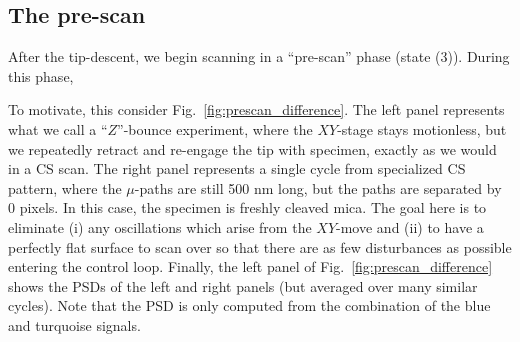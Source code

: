 \documentclass[twocolumn,oneside]{IEEEtran/IEEEtran}
\begin{document}
\subsection{The pre-scan}
%     
%     
%     
After the tip-descent, we begin scanning in a ``pre-scan'' phase (state (3)).
During this phase, 

To motivate, this consider Fig.~\ref{fig:prescan_difference}. The left panel
represents what we call a ``$Z$''-bounce experiment, where the $XY$-stage stays
motionless, but we repeatedly retract and re-engage the tip with specimen,
exactly as we would in a CS scan. The right panel represents a single cycle from
specialized CS pattern, where the $\mu$-paths are still 500 nm long, but the
paths are separated by 0 pixels.
In this case, the specimen is freshly cleaved
mica.
The goal here is to eliminate (i) any oscillations which arise from the
$XY$-move and (ii) to have a perfectly flat surface to scan over so that
there are as few disturbances as possible entering the control loop. Finally,
the left panel of Fig.~\ref{fig:prescan_difference} shows the PSDs of the left
and right panels (but averaged over many similar cycles). Note that the PSD is
only computed from the combination of the blue and turquoise signals.
\end{document}
